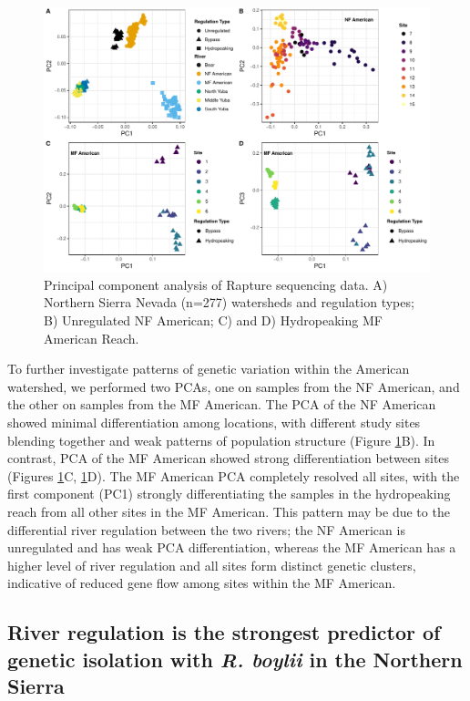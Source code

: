 \documentclass[proquest,12pt,final]{ucthesis-CA2012} %
\begin{document}
\begin{ucmainmatter}
\begin{figure}
\includegraphics[width=1\linewidth]{figure/ch1/fig_02_pca_combined_v2} \caption{Principal component analysis of Rapture sequencing
data. A) Northern Sierra Nevada (n=277) watersheds and regulation types;
B) Unregulated NF American; C) and D) Hydropeaking MF American Reach.}\label{fig:CH1F2pca}
\end{figure}
To further investigate patterns of genetic variation within the American
watershed, we performed two PCAs, one on samples from the NF American,
and the other on samples from the MF American. The PCA of the NF
American showed minimal differentiation among locations, with different
study sites blending together and weak patterns of population structure
(Figure \ref{fig:CH1F2pca}B). In contrast, PCA of the MF American showed
strong differentiation between sites (Figures \ref{fig:CH1F2pca}C,
\ref{fig:CH1F2pca}D). The MF American PCA completely resolved all sites,
with the first component (PC1) strongly differentiating the samples in
the hydropeaking reach from all other sites in the MF American. This
pattern may be due to the differential river regulation between the two
rivers; the NF American is unregulated and has weak PCA differentiation,
whereas the MF American has a higher level of river regulation and all
sites form distinct genetic clusters, indicative of reduced gene flow
among sites within the MF American.

\hypertarget{river-regulation-is-the-strongest-predictor-of-genetic-isolation-with-r.-boylii-in-the-northern-sierra}{%
\subsection{\texorpdfstring{River regulation is the strongest predictor
of genetic isolation with \emph{R. boylii} in the Northern
Sierra}{River regulation is the strongest predictor of genetic isolation with R. boylii in the Northern Sierra}}\label{river-regulation-is-the-strongest-predictor-of-genetic-isolation-with-r.-boylii-in-the-northern-sierra}}


\end{ucmainmatter}
\end{document}
